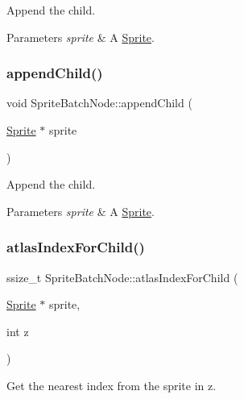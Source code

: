 Append the child.


\begin{DoxyParams}{Parameters}
{\em sprite} & A \hyperlink{classSprite}{Sprite}. \\
\hline
\end{DoxyParams}
\mbox{\label{classSpriteBatchNode_a8da90ef24ba5d4c27b063a302498c436}} 
\subsubsection{\texorpdfstring{append\+Child()}{appendChild()}\hspace{0.1cm}{\footnotesize\ttfamily [2/2]}}
{\footnotesize\ttfamily void Sprite\+Batch\+Node\+::append\+Child (\begin{DoxyParamCaption}\item[{\hyperlink{classSprite}{Sprite} $\ast$}]{sprite }\end{DoxyParamCaption})}

Append the child.


\begin{DoxyParams}{Parameters}
{\em sprite} & A \hyperlink{classSprite}{Sprite}. \\
\hline
\end{DoxyParams}
\mbox{\label{classSpriteBatchNode_a86c50a80880095b311ba60fa04c4152f}} 
\subsubsection{\texorpdfstring{atlas\+Index\+For\+Child()}{atlasIndexForChild()}\hspace{0.1cm}{\footnotesize\ttfamily [1/2]}}
{\footnotesize\ttfamily ssize\+\_\+t Sprite\+Batch\+Node\+::atlas\+Index\+For\+Child (\begin{DoxyParamCaption}\item[{\hyperlink{classSprite}{Sprite} $\ast$}]{sprite,  }\item[{int}]{z }\end{DoxyParamCaption})}

Get the nearest index from the sprite in z.


